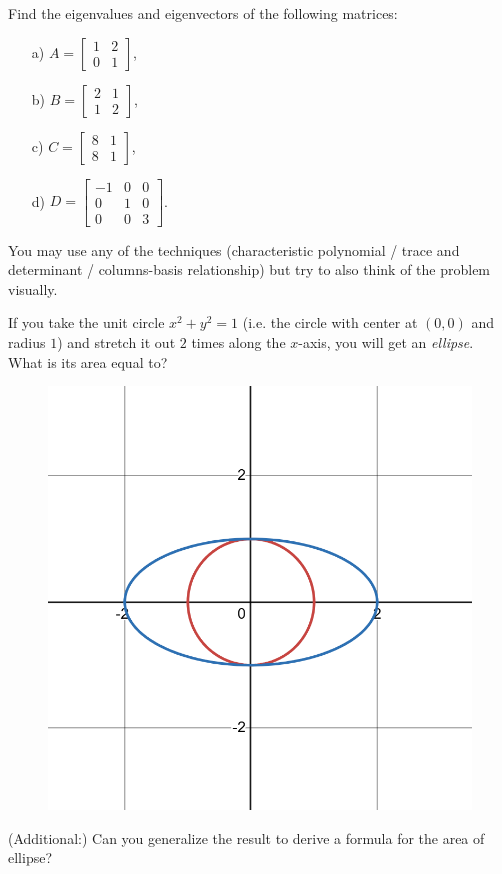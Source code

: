 \medskip 

\begin{problem}
    Find the eigenvalues and eigenvectors of the following matrices:

    \begin{enumerate}
        \item[a) ] $A=\begin{bmatrix}
            1&2\\0&1\end{bmatrix}$,

        \item[b) ] $B=\begin{bmatrix}
            2&1\\1&2
        \end{bmatrix}$,
        
        \item[c) ] $C=\begin{bmatrix}
            8 & 1 \\ 8 & 1
        \end{bmatrix}$,
        
        \item[d) ] $D=\begin{bmatrix}
-1&0&0\\0&1&0\\0&0&3        \end{bmatrix}$.
    \end{enumerate}

    You may use any of the techniques (characteristic polynomial / trace and determinant / columns-basis relationship) but try to also think of the problem visually.
\end{problem}


\medskip 

\begin{problem}
    If you take the unit circle $x^2+y^2=1$ (i.e. the circle with center at $(0,0)$ and radius $1$) and stretch it out $2$ times along the $x$-axis, you will get an \textit{ellipse}. What is its area equal to?

    \begin{figure}[h]
        \centering
        \includegraphics[width=0.5\linewidth]{ellipse.png}
    \end{figure}

    (Additional:) Can you generalize the result to derive a formula for the area of ellipse?
\end{problem}



